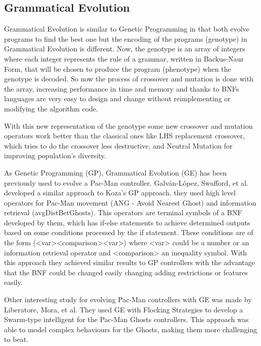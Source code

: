 \documentclass{llncs}
\begin{document}
\subsection{Grammatical Evolution}
Grammatical Evolution is similar to Genetic Programming in that both evolve programs to find the best one but the encoding of the programs (genotype) in Grammatical Evolution is different. Now, the genotype is an array of integers where each integer represents the rule of a grammar, written in Backus-Naur Form,
that will be chosen to produce the program (phenotype) when the genotype is decoded. So now the process of crossover and mutation is done with the array, increasing performance in time and memory and thanks to BNFs languages are very easy to design and change without reimplementing or modifying the algorithm code.%

With this new representation of the genotype some new crossover and mutation operators work better than the classical ones like LHS replacement crossover, which tries to do the crossover less destructive,
and Neutral Mutation for improving population's diversity. %

As Genetic Programming (GP), Grammatical Evolution (GE) has been previously used to evolve a Pac-Man controller. Galván-López, Swafford, et al.
developed a similar approach to Koza's GP approach, they used high level operators for Pac-Man movement (ANG - Avoid Nearest Ghost) and information retrieval (avgDistBetGhosts). This operators are terminal symbols of a BNF developed by them, which has if-else statements to achieve determined outputs based on some conditions processed by the if statement. These conditions are of the form (<var><comparison><var>) where <var> could be a number or an information retrieval operator and <comparison> an inequality symbol. With this approach they achieved similar results to GP controllers with the advantage that the BNF could be changed easily changing adding restrictions or features easily.

Other interesting study for evolving Pac-Man controllers with GE was made by Liberatore, Mora, et al.
They used GE with Flocking Strategies to develop a Swarm-type intelligent for the Pac-Man Ghosts controllers. This approach was able to model complex behaviours for the Ghosts, making them more challenging to beat.
\end{document}
